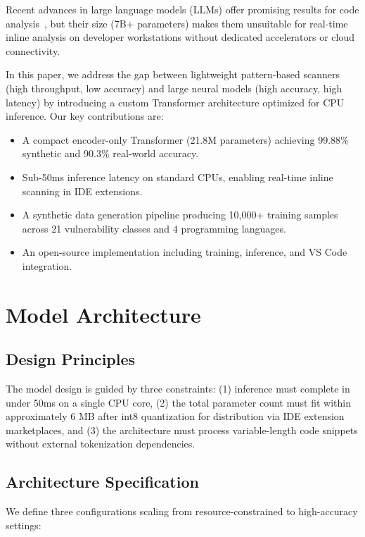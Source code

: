 \documentclass[conference,compsoc]{IEEEtran}
\begin{document}
Recent advances in large language models (LLMs) offer promising results for code analysis~\cite{pearce2022}, but their size (7B+ parameters) makes them unsuitable for real-time inline analysis on developer workstations without dedicated accelerators or cloud connectivity.

In this paper, we address the gap between lightweight pattern-based scanners (high throughput, low accuracy) and large neural models (high accuracy, high latency) by introducing a custom Transformer architecture optimized for CPU inference. Our key contributions are:

\begin{itemize}
    \item A compact encoder-only Transformer (21.8M parameters) achieving 99.88\% synthetic and 90.3\% real-world accuracy.
    \item Sub-50ms inference latency on standard CPUs, enabling real-time inline scanning in IDE extensions.
    \item A synthetic data generation pipeline producing 10,000+ training samples across 21 vulnerability classes and 4 programming languages.
    \item An open-source implementation including training, inference, and VS Code integration.
\end{itemize}

\section{Model Architecture}
\label{sec:architecture}

\subsection{Design Principles}

The model design is guided by three constraints: (1) inference must complete in under 50ms on a single CPU core, (2) the total parameter count must fit within approximately 6 MB after int8 quantization for distribution via IDE extension marketplaces, and (3) the architecture must process variable-length code snippets without external tokenization dependencies.

\subsection{Architecture Specification}

We define three configurations scaling from resource-constrained to high-accuracy settings:
\end{document}
